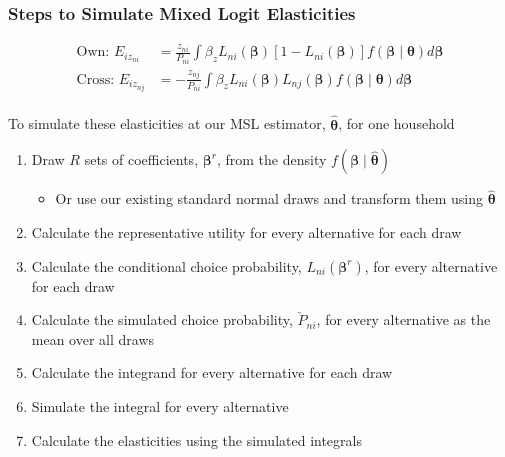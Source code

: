 \documentclass{beamer}\usepackage[]{graphicx}\usepackage[]{xcolor}
\begin{document}
\begin{frame}\frametitle{Steps to Simulate Mixed Logit Elasticities}
	\vspace{-3ex}
	\begin{align*}
    	\text{Own: } E_{iz_{ni}} & = \frac{z_{ni}}{P_{ni}} \int \beta_z L_{ni}(\bm{\beta}) [1 - L_{ni}(\bm{\beta})] f(\bm{\beta} \mid \bm{\theta}) d \bm{\beta} \\
    	\text{Cross: } E_{iz_{nj}} & = - \frac{z_{nj}}{P_{ni}} \int \beta_z L_{ni}(\bm{\beta}) L_{nj}(\bm{\beta}) f(\bm{\beta} \mid \bm{\theta}) d \bm{\beta}
    \end{align*} \\
    \vspace{-1ex}
    To simulate these elasticities at our MSL estimator, $\widehat{\bm{\theta}}$, for one household
    \begin{enumerate}
        \item Draw $R$ sets of coefficients, $\bm{\beta}^r$, from the density $f(\bm{\beta} \mid \widehat{\bm{\theta}})$
        \begin{itemize}
        	\item Or use our existing standard normal draws and transform them using $\widehat{\bm{\theta}}$
        \end{itemize}
        \item Calculate the representative utility for every alternative for each draw
        \item Calculate the conditional choice probability, $L_{ni}(\bm{\beta}^r)$, for every alternative for each draw
        \item Calculate the simulated choice probability, $\check{P}_{ni}$, for every alternative as the mean over all draws
        \item Calculate the integrand for every alternative for each draw
        \item Simulate the integral for every alternative
        \item Calculate the elasticities using the simulated integrals
    \end{enumerate}
\end{frame}
\end{document}

